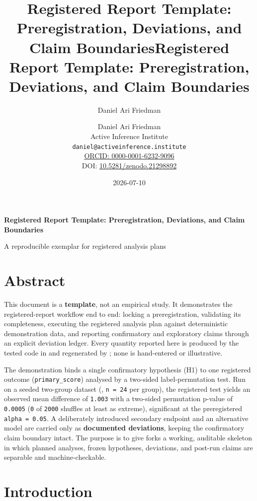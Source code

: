 \documentclass[
]{article}
\title{Registered Report Template: Preregistration, Deviations, and
Claim Boundaries}
\author{Daniel Ari Friedman}
\date{}
\title{Registered Report Template: Preregistration, Deviations, and Claim Boundaries}
\author{Daniel Ari Friedman\\\footnotesize{Active Inference Institute}\\\footnotesize{\texttt{daniel@activeinference.institute}}\\\footnotesize{\href{https://orcid.org/0000-0001-6232-9096}{ORCID: 0000-0001-6232-9096}} \\ \footnotesize{DOI: \href{https://doi.org/10.5281/zenodo.21298892}{10.5281/zenodo.21298892}}}
\date{2026-07-10}
\newcounter{none} %
\begin{document}
\begin{titlepage}
\centering
\vspace*{2cm}
{\LARGE\bfseries Registered Report Template: Preregistration, Deviations, and Claim Boundaries\par}
\vspace{0.75em}
{\large A reproducible exemplar for registered analysis plans\par}
\vfill
\makeatletter
{\@author\par}
\vspace{1em}
{\@date\par}
\makeatother
\vfill
\end{titlepage}
\thispagestyle{empty}
\tableofcontents
\newpage

\section{Abstract}\label{sec:abstract}

This document is a \textbf{template}, not an empirical study. It
demonstrates the registered-report workflow end to end: locking a
preregistration, validating its completeness, executing the registered
analysis plan against deterministic demonstration data, and reporting
confirmatory and exploratory claims through an explicit deviation
ledger. Every quantity reported here is produced by the tested code in
 and regenerated by
; none is hand-entered or
illustrative.

The demonstration binds a single confirmatory hypothesis (H1) to one
registered outcome (\texttt{primary\_score}) analysed by a two-sided
label-permutation test. Run on a seeded two-group dataset
(, \texttt{n\ =\ 24} per group), the
registered test yields an observed mean difference of \texttt{1.003}
with a two-sided permutation p-value of \texttt{0.0005} (\texttt{0} of
\texttt{2000} shuffles at least as extreme), significant at the
preregistered \texttt{alpha\ =\ 0.05}. A deliberately introduced
secondary endpoint and an alternative model are carried only as
\textbf{documented deviations}, keeping the confirmatory claim boundary
intact. The purpose is to give forks a working, auditable skeleton in
which planned analyses, frozen hypotheses, deviations, and post-run
claims are separable and machine-checkable.

\newpage

\section{Introduction}\label{sec:introduction}
\end{document}
